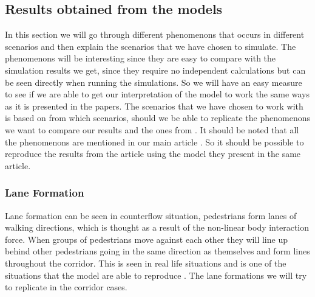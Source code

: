 \subsection{Results obtained from the models}
In this section we will go through different phenomenons that occurs in different scenarios and then
explain the scenarios that we have chosen to simulate. The phenomenons will be interesting since they
are easy to compare with the simulation results we get, since they require no independent calculations
but can be seen directly when running the simulations. So we will have an easy measure to see if we
are able to get our interpretation of the model to work the same ways as it is presented in the papers.
The scenarios that we have chosen to work with is based on from which scenarios, should we be able
to replicate the phenomenons we want to compare our results and the ones from \cite{self-org}.
It should be noted that all the phenomenons are mentioned in our main article \cite{self-org}.
So it should be possible to reproduce the results from the article using the model they present in the same article.

\subsubsection{Lane Formation}
Lane formation can be seen in counterflow situation, pedestrians form lanes of walking
directions, which is thought as a result of the non-linear body interaction
force. When groups of pedestrians move against each other they will line up behind other
pedestrians going in the same direction as themselves and form lines throughout the corridor.
This is seen in real life situations and is one of the situations that the model are able to reproduce \cite{self-org}.
The lane formations we will try to replicate in the corridor cases.

